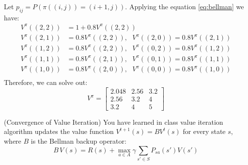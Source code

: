 \documentclass[a4paper,12pt, answers]{exam} %
\begin{document}
\begin{questions}
\begin{solution}

Let $p_{ij} = P(\pi((i,j)) = (i+1, j))$.
Applying the equation \eqref{eq:bellman} we have:
\begin{align*}
    V^{\pi}((2, 2)) & = 1 + 0.8 V^{\pi}((2,2)) \\
    V^{\pi}((2, 1)) & = 0.8 V^{\pi}((2,2)),\text{   }V^{\pi}((2, 0)) = 0.8 V^{\pi}((2,1)) \\
    V^{\pi}((1, 2)) & = 0.8 V^{\pi}((2,2)), \text{   } V^{\pi}((0, 2)) = 0.8 V^{\pi}((1,2)) \\
    V^{\pi}((1, 1)) & = 0.8 V^{\pi}((2, 1)), \text{   }
    V^{\pi}((0, 1)) = 0.8 V^{\pi}((1,1)) \\
    V^{\pi}((1, 0)) & = 0.8 V^{\pi}((2, 0)), \text{   }
    V^{\pi}((0, 0)) = 0.8 V^{\pi}((1, 0))\\
\end{align*}
Therefore, we can solve out:
\begin{equation}
    V^{\pi} = \begin{bmatrix}
    2.048 & 2.56 & 3.2 \\
    2.56 & 3.2 & 4 \\
    3.2 & 4 & 5
    \end{bmatrix}
\end{equation}

\end{solution}
\question[2] (Convergence of Value Iteration)
You have learned in class value iteration algorithm 
updates the value function
$V^{t+1}(s)=BV^{t}(s)$ for every state $s$,
where $B$ is the Bellman backup operator:
\begin{equation}
B\,V(s) = R(s) + \max_{a\in A} \gamma \sum_{s' \in S}
P_{sa}(s')V(s')
\end{equation}
\begin{solution}
    \begin{parts}

\end{parts}
\end{solution}
\end{questions}
\end{document}
